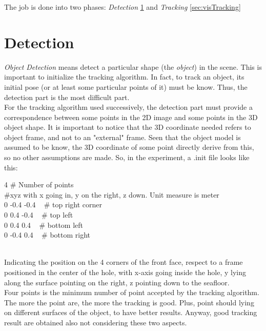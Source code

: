 The job is done into two phases: \textit{Detection} \ref{sec:visDetect}
 and \textit{Tracking} \ref{sec:visTracking}


\section{Detection}
\label{sec:visDetect}

\textit{Object Detection} means detect a particular shape (the \textit{object}) in the scene. This is important to initialize the tracking algorithm. In fact, to track an object, its initial pose (or at least some particular points of it) must be know. Thus, the detection part is the most difficult part.\\
For the tracking algorithm used successively, the detection part must provide a correspondence between some points in the 2D image and some points in the 3D object shape. It is important to notice that the 3D coordinate needed refers to object frame, and not to an "external" frame. Seen that the object model is assumed to be know, the 3D coordinate of some point directly derive from this, so no other assumptions are made. So, in the experiment, a .init file looks like this:
\begin{algorithm*}
	4        \hspace{40px}      \# Number of points \\
	          \hspace*{50px}        \#xyz with x going in, y on the right, z down. Unit measure is meter\\
	0      -0.4     -0.4  ~ \# top right corner\\
	0      0.4      -0.4  ~   \# top left\\
	0      0.4     0.4   ~  \# bottom left\\
	0      -0.4    0.4    ~ \# bottom right\\
\end{algorithm*}\\
Indicating the position on the 4 corners of the front face, respect to a frame positioned in the center of the hole, with x-axis going inside the hole, y lying along the surface pointing on the right, z pointing down to the seafloor.\\
Four points is the minimum number of point accepted by the tracking algorithm. The more the point are, the more the tracking is good. Plus, point should lying on different surfaces of the object, to have better results. Anyway, good tracking result are obtained also not considering these two aspects.\\

